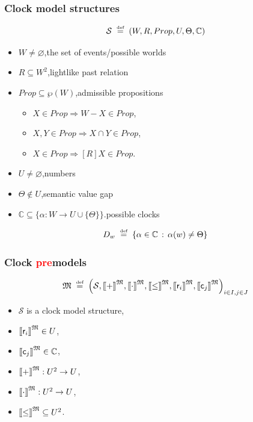 \documentclass[xcolor=x11names]{beamer}
\newcommand{\cemph}[1]{\textcolor{red}{#1}}
\newcommand{\defegy}[1][.1]{\hspace{#1cm}\overset{\textup{\tiny def}}{=}\hspace{#1cm}}
\newcommand{\intension}[2][]{{[}\hspace{-.46mm}{[} {#2}{]}\hspace{-.46mm}{]}^{\mathfrak{#1}}}
\begin{document}
\begin{frame}[t]
\frametitle{Clock model structures}
\footnotesize

\[\mathcal S\defegy \left( W, R, Prop, U, \Theta, \mathbb C\right)\]

\begin{itemize}
\item $W\neq \varnothing$,\hfill the set of events/possible worlds
\item $R\subseteq W^2$,\hfill lightlike past relation
\item $Prop\subseteq \wp (W)$,\hfill admissible propositions
 \begin{itemize}
 \item \hspace{3mm} $X\in Prop \Rightarrow W-X \in Prop$, \hfill
 \item $X,Y\in Prop \Rightarrow X\cap Y \in Prop$, \hfill
 \item \hspace{3mm} $X\in Prop \Rightarrow [R]X\in Prop$. \hfill
 \end{itemize}
\item $U\neq \varnothing$,\hfill numbers
\item $\Theta\notin U$,\hfill semantic value gap
\item $\mathbb C \subseteq \{ \alpha : {W}\to U\cup \{\Theta\}\}$.\hfill  possible clocks
\end{itemize}

\[ D_w \defegy \{ \alpha \in \mathbb C \, : \, \alpha(w)\neq \Theta\} \]
\end{frame}

\begin{frame}[t]
\frametitle{Clock \cemph{pre}models}
\footnotesize
\[\mathfrak M \defegy \left( \mathcal S, \intension[M]{+}, \intension[M]{\cdot}, \intension[M]{\leq}, \intension[M]{\mathsf r_i}, \intension[M]{\mathsf c_j}\right)_{\substack{i\in I,j\in J }}\]

\begin{itemize}
\item $\mathcal S$ is a clock model structure,
\item $\intension[M]{\mathsf r_i} \in U$,
\item $\intension[M]{\mathsf c_j} \in \mathbb C$,
\item $\intension[M]{+} : U^2\to U$,
\item $\intension[M]{\cdot} : U^2\to U$,
\item $\intension[M]{\leq} \subseteq  U^2$.
\end{itemize}
\end{frame}
\end{document}
